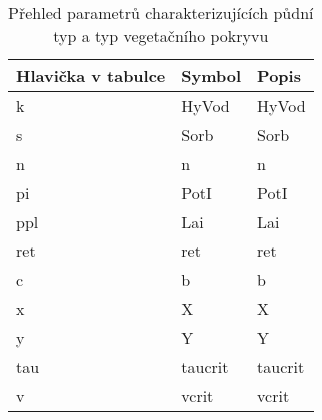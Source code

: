 \begin{table}%
  \centering
  \caption{Přehled parametrů charakterizujících půdní typ a typ vegetačního pokryvu}
  {\small
    \begin{tabular}{p{1.5cm}lp{4cm}}
    \hline
    Hlavička v tabulce & Symbol & Popis \\
    \hline \hline
    k&\acs{HyVod}  & \acl{HyVod} \\
    s&\acs{Sorb}   & \acl{Sorb} \\
    n&\acs{n}      & \acl{n}\\
    pi&\acs{PotI}   & \acl{PotI}\\
    ppl&\acs{Lai}    & \acl{Lai} \\
    ret&\acs{ret}    & \acl{ret} \\
    c&\acs{b}      & \acl{b} \\
    x&\acs{X}      & \acl{X} \\
    y&\acs{Y}      & \acl{Y} \\
    tau&\acs{taucrit}& \acl{taucrit} \\
    v&\acs{vcrit}  & \acl{vcrit} \\
    \hline
    \end{tabular}%
  }
  \label{tab:soilveg}%
\end{table}%